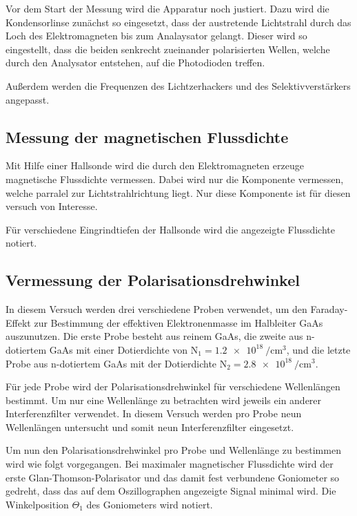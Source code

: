 Vor dem Start der Messung wird die Apparatur noch justiert. 
Dazu wird die Kondensorlinse zunächst so eingesetzt, dass der 
austretende Lichtstrahl durch das Loch des Elektromagneten 
bis zum Analaysator gelangt. Dieser wird so eingestellt, dass 
die beiden senkrecht zueinander polarisierten Wellen, welche 
durch den Analysator entstehen, auf die Photodioden treffen.

Außerdem werden die Frequenzen des Lichtzerhackers und 
des Selektivverstärkers angepasst. 

%
\subsection{Messung der magnetischen Flussdichte}
%

Mit Hilfe einer Hallsonde wird die durch den Elektromagneten 
erzeuge magnetische Flussdichte vermessen. Dabei wird 
nur die Komponente vermessen, welche parralel zur 
Lichtstrahlrichtung liegt. Nur diese Komponente ist 
für diesen versuch von Interesse. 

Für verschiedene Eingrindtiefen der Hallsonde wird die 
angezeigte Flussdichte notiert.

%
\subsection{Vermessung der Polarisationsdrehwinkel}
%

In diesem Versuch werden drei verschiedene Proben 
verwendet, um den Faraday-Effekt zur Bestimmung der 
effektiven Elektronenmasse im Halbleiter GaAs auszunutzen. 
Die erste Probe besteht aus reinem GaAs, die zweite  aus 
n-dotiertem GaAs mit einer Dotierdichte von 
$\text{N}_1 =\SI{1.2e18}{\per\centi\metre^3}$, und 
die letzte Probe aus n-dotiertem GaAs mit der 
Dotierdichte 
$\text{N}_2 =\SI{2.8e18}{\per\centi\metre^3}$.

Für jede Probe wird der Polarisationsdrehwinkel für 
verschiedene Wellenlängen bestimmt. Um nur 
eine Wellenlänge zu betrachten wird jeweils ein 
anderer Interferenzfilter verwendet. In diesem 
Versuch werden pro Probe neun Wellenlängen untersucht und 
somit neun Interferenzfilter eingesetzt.

Um nun den Polarisationsdrehwinkel pro Probe und Wellenlänge 
zu bestimmen wird wie folgt vorgegangen. 
Bei maximaler magnetischer Flussdichte wird der erste 
Glan-Thomson-Polarisator und das damit fest verbundene 
Goniometer so gedreht, dass das auf dem Oszillographen angezeigte 
Signal minimal wird. Die Winkelposition $\Theta_1$ des Goniometers 
wird notiert.

